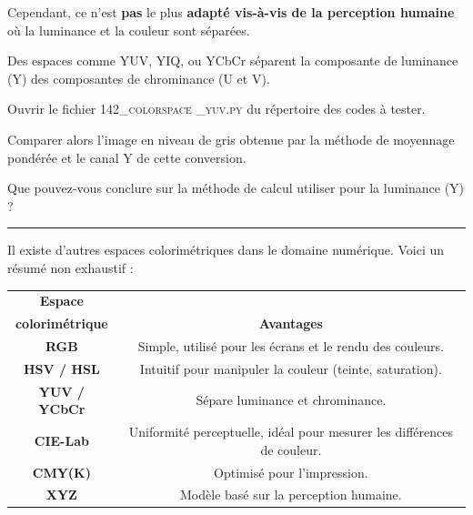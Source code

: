 \documentclass[a4paper,12pt,titlepage]{article} %
\begin{document}
Cependant, ce n'est \textbf{pas} le plus \textbf{adapté vis-à-vis de la perception humaine} où la luminance et la couleur sont séparées.

Des espaces comme YUV, YIQ, ou YCbCr séparent la composante de luminance (Y) des composantes de chrominance (U et V).

\Manip Ouvrir le fichier \textsc{142\_colorspace \_yuv.py} du répertoire des codes à tester.

\Manip Comparer alors l'image en niveau de gris obtenue par la méthode de moyennage pondérée et le canal Y de cette conversion.

\Quest Que pouvez-vous conclure sur la méthode de calcul utiliser pour la luminance (Y) ?

\medskip

\noindent \rule{\linewidth}{1pt}

Il existe d'autres espaces colorimétriques dans le domaine numérique. Voici un résumé non exhaustif :

\begin{center}
\begin{tabular}{|c|c|}
\hline
\textbf{Espace } &  \\
\textbf{colorimétrique} & \textbf{Avantages} \\ \hline
\textbf{RGB} & Simple, utilisé pour les écrans et le rendu des couleurs. \\ \hline
\textbf{HSV / HSL} & Intuitif pour manipuler la couleur (teinte, saturation). \\ \hline
\textbf{YUV / YCbCr} & Sépare luminance et chrominance. \\ \hline
\textbf{CIE-Lab} & Uniformité perceptuelle, idéal pour mesurer les différences de couleur. \\ \hline
\textbf{CMY(K)} & Optimisé pour l'impression. \\ \hline
\textbf{XYZ} & Modèle basé sur la perception humaine. \\ \hline
\end{tabular}
\end{center}




\cleardoublepage
\end{document}
